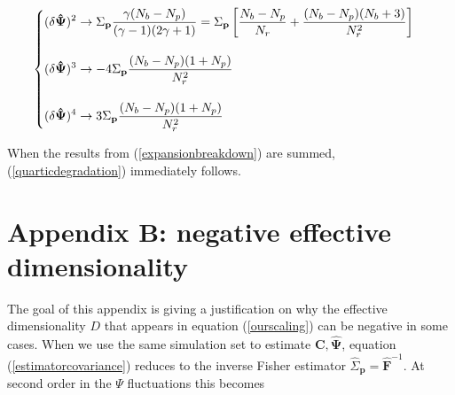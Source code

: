 \documentclass[reprint,aps,prd,superscriptaddress,showkeys,showpacs]{revtex4-1}
\newcommand{\bb}[1]{\mathbf{#1}}
\newcommand{\bbh}[1]{\mathbf{\hat{#1}}}
\newcommand{\h}[1]{\hat{#1}}
\begin{document}
\begin{widetext}
\begin{equation}
\label{expansionbreakdown}
\begin{cases}
\begin{displaystyle}
(\delta\bbh{\Psi})^2 \rightarrow \Sigma_\bb{p}\frac{\gamma(N_b-N_p)}{(\gamma-1)(2\gamma+1)} = \Sigma_\bb{p}\left[\frac{N_b-N_p}{N_r}+\frac{(N_b-N_p)(N_b+3)}{N_r^2}\right]
\end{displaystyle} \\ \\

\begin{displaystyle}
(\delta\bbh{\Psi})^3 \rightarrow -4\Sigma_\bb{p}\frac{(N_b-N_p)(1+N_p)}{N_r^2}
\end{displaystyle} \\ \\


\begin{displaystyle}
(\delta\bbh{\Psi})^4 \rightarrow 3\Sigma_\bb{p}\frac{(N_b-N_p)(1+N_p)}{N_r^2}
\end{displaystyle}

\end{cases}
\end{equation}
\end{widetext}
%
When the results from (\ref{expansionbreakdown}) are summed, (\ref{quarticdegradation}) immediately follows. 


\section*{Appendix B: negative effective dimensionality}
\label{appendixB}

The goal of this appendix is giving a justification on why the effective dimensionality $D$ that appears in equation (\ref{ourscaling}) can be negative in some cases. When we use the same simulation set to estimate $\bb{C},\bbh{\Psi}$, equation (\ref{estimatorcovariance}) reduces to the inverse Fisher estimator $\h{\Sigma}_\bb{p}=\bbh{F}^{-1}$. At second order in the $\Psi$ fluctuations this becomes
\end{document}
